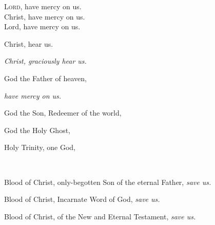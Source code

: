 \newHymn

\JustHymnNum
{}


\begin{multicols}{2}

\lettrine{L}{ord,} have mercy on us.\\
Christ, have mercy on us.\\
Lord, have mercy on us.\\
\begin{hangparas}{1em}{1}
\parskip0mm
\raggedright
Christ, hear us.

{\itshape Christ, graciously hear us.}

God the Father of heaven,

{\itshape have mercy on us.}

God the Son, Redeemer of the world,

God the Holy Ghost,

Holy Trinity, one God,

~ \quad

Blood of Christ, only-begotten Son of the eternal Father, \textit{save
us.}

Blood of Christ, Incarnate Word of God, \textit{save us.}

Blood of Christ, of the New and Eternal Testament, \textit{save us.}


\end{hangparas}
\end{multicols}
